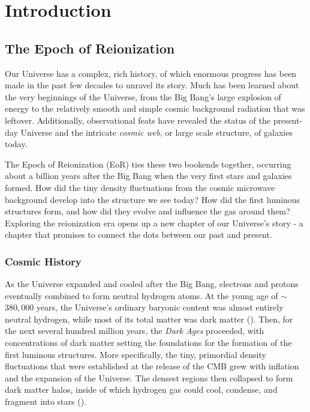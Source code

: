 \chapter{Introduction}
\label{c.intro}

\section{The Epoch of Reionization}

Our Universe has a complex, rich history, of which enormous progress has been made in the past few decades to unravel its story. Much has been learned about the very beginnings of the Universe, from the Big Bang's large explosion of energy to the relatively smooth and simple cosmic background radiation that was leftover. Additionally, observational feats have revealed the status of the present-day Universe and the intricate \textit{cosmic web}, or large scale structure, of galaxies today. 

The Epoch of Reionization (EoR) ties these two bookends together, occurring about a billion years after the Big Bang when the very first stars and galaxies formed. How did the tiny density fluctuations from the cosmic microwave background develop into the structure we see today? How did the first luminous structures form, and how did they evolve and influence the gas around them? Exploring the reionization era opens up a new chapter of our Universe's story - a chapter that promises to connect the dots between our past and present.

\subsection{Cosmic History}

As the Universe expanded and cooled after the Big Bang, electrons and protons eventually combined to form neutral hydrogen atoms. At the young age of $\sim$ $380,000$ years, the Universe's ordinary baryonic content was almost entirely neutral hydrogen, while most of its total matter was dark matter (\citealt{loeb_furlanetto_2013}). Then, for the next several hundred million years, the \textit{Dark Ages} proceeded, with concentrations of dark matter setting the foundations for the formation of the first luminous structures. More specifically, the tiny, primordial density fluctuations that were established at the release of the CMB grew with inflation and the expansion of the Universe. The densest regions then collapsed to form dark matter halos, inside of which hydrogen gas could cool, condense, and fragment into stars (\citealt{dodelson_cosmology}).

